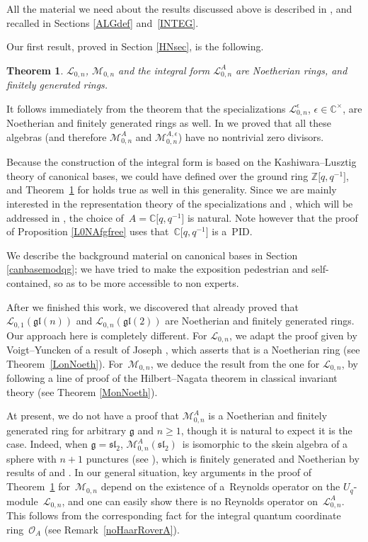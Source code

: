 \documentclass[pdftex]{sigma}
\numberwithin{equation}{section}
\newtheorem{teo}{Theorem}[section]
\theoremstyle{definition}
\newcommand{\e}{\epsilon}
\newcommand{\mc}{\mathbb{C}}
\newcommand{\Ll}{{\mathcal L}}
\newcommand{\Mm}{{\mathcal M}}
\newcommand{\Oo}{{\mathcal O}}
\begin{document}
All the material we need about the results discussed above is described in \cite{BR}, and recalled in Sections \ref{ALGdef} and~\ref{INTEG}.

Our first result, proved in Section \ref{HNsec}, is the following.

\begin{teo}\label{HN} $\Ll_{0,n}$, $\Mm_{0,n}$ and the integral form $\Ll_{0,n}^A$ are Noetherian rings, and finitely generated rings.
\end{teo}
It follows immediately from the theorem that the specializations $\Ll_{0,n}^\e$, $\e \in \mc^\times$, are Noetherian and finitely generated rings as well. In \cite{BR} we proved that all these algebras (and therefore $\Mm_{0,n}^A$ and $\Mm_{0,n}^{A,\e}$) have no nontrivial zero divisors.

Because the construction of the integral form \smash{$\Ll_{0,n}^A$} is based on the Kashiwara--Lusztig theory of canonical bases, we could have defined \smash{$\Ll_{0,n}^A$} over the ground ring $\mathbb{Z}\big[q,q^{-1}\big]$, and Theorem~\ref{HN} for \smash{$\Ll_{0,n}^A$} holds true as well in this generality. Since we are mainly interested in the representation theory of the specializations \smash{$\Ll_{0,n}^\e$} and \smash{$\Mm_{0,n}^{A,\e}$}, which will be addressed in \cite{BFR2}, the choice of~${A=\mc\big[q,q^{-1}\big]}$ is natural. Note however that the proof of Proposition \ref{L0NAfgfree} uses that~${\mc\big[q,q^{-1}\big]}$ is a~PID.

We describe the background material on canonical bases in Section \ref{canbasemodqg}; we have tried to make the exposition pedestrian and self-contained, so as to be more accessible to non experts.

After we finished this work, we discovered that \cite{DomLen} already proved that $\Ll_{0,1}(\mathfrak{gl}(n))$ and $\Ll_{0,n}(\mathfrak{gl}(2))$ are Noetherian and finitely generated rings. Our approach here is completely different. For $\Ll_{0,n}$, we adapt the proof given by Voigt--Yuncken \cite{VY} of a result of Joseph \cite{Jos}, which asserts that  is a Noetherian ring (see Theorem~\ref{LonNoeth}). For~$\Mm_{0,n}$, we deduce the result from the one for $\Ll_{0,n}$, by following a line of proof of the Hilbert--Nagata theorem in classical invariant theory (see Theorem \ref{MonNoeth}).

At present, we do not have a proof that $\Mm_{0,n}^A$ is a Noetherian and finitely generated ring for arbitrary $\mathfrak{g}$ and $n\geq 1$, though it is natural to expect it is the case. Indeed, when ${\mathfrak{g}= {\mathfrak{sl}_2}}$, $\Mm_{0,n}^A({\mathfrak{sl}_2})$~is isomorphic to the skein algebra of a sphere with $n+1$ punctures (see \cite[Theorem~8.6]{BR}), which is finitely generated and Noetherian by results of \cite{Bul} and \cite{PS}. In our general situation, key arguments in the proof of Theorem~\ref{HN} for~$\Mm_{0,n}$ depend on the existence of a~Reynolds operator on the $U_q$-module~$\Ll_{0,n}$, and one can easily show there is no Reynolds operator on~$\Ll_{0,n}^A$. This follows from the corresponding fact for the integral quantum coordinate ring~$\Oo_A$ (see Remark~\ref{noHaarRoverA}).
\end{document}
